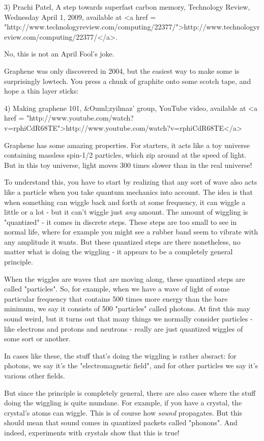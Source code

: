 3) Prachi Patel, A step towards superfast carbon memory, 
Technology Review, Wednesday April 1, 2009, available at  
<a href = "http://www.technologyreview.com/computing/22377/">http://www.technologyreview.com/computing/22377/</a>.

No, this is not an April Fool's joke.

Graphene was only discovered in 2004, but the easiest way to 
make some is surprisingly lowtech.  You press a chunk of 
graphite onto some scotch tape, and hope a thin layer sticks:

4) Making graphene 101, &Ouml;zyilmaz' group, YouTube video, 
available at <a href = "http://www.youtube.com/watch?v=rphiCdR68TE">http://www.youtube.com/watch?v=rphiCdR68TE</a>

Graphene has some amazing properties.  For starters, it acts 
like a toy universe containing massless spin-1/2 particles, 
which zip around at the speed of light.  But in this toy
universe, light moves 300 times slower than in the real universe!

To understand this, you have to start by realizing that any sort of
wave also acts like a particle when you take quantum mechanics into
account.  The idea is that when something can wiggle back and forth at
some frequency, it can wiggle a little or a lot - but it can't wiggle
just \emph{any} amount.  The amount of wiggling is
"quantized" - it comes in discrete steps.  These steps are
too small to see in normal life, where for example you might see a
rubber band seem to vibrate with any amplitude it wants.  But these
quantized steps are there nonetheless, no matter what is doing the
wiggling - it appears to be a completely general principle.

When the wiggles are waves that are moving along, these quantized
steps are called "particles".  So, for example, when we have
a wave of light of some particular frequency that contains 500 times
more energy than the bare minimum, we say it consists of 500
"particles" called photons.  At first this may sound weird,
but it turns out that many things we normally consider particles -
like electrons and protons and neutrons - really are just quantized
wiggles of some sort or another.

In cases like these, the stuff that's doing the wiggling is rather
absract: for photons, we say it's the "electromagnetic
field", and for other particles we say it's various other fields.

But since the principle is completely general, there are also cases
where the stuff doing the wiggling is quite mundane.  For example, if
you have a crystal, the crystal's atoms can wiggle.  This is of course
how \emph{sound} propagates.  But this should mean that sound comes in
quantized packets called "phonons".  And indeed, experiments
with crystals show that this is true!

